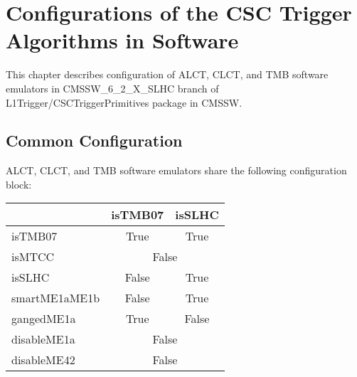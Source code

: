 \section{Configurations of the CSC Trigger Algorithms in Software}

This chapter describes configuration of ALCT, CLCT, and TMB software emulators in CMSSW\_6\_2\_X\_SLHC branch of L1Trigger/CSCTriggerPrimitives package in CMSSW.

\subsection{Common Configuration}
\label{sec:common_conf}

ALCT, CLCT, and TMB software emulators share the following configuration block:

\begin{center}
	\begin{tabular}{|l|c|c|}
		\hline
		& isTMB07 & isSLHC \\
		\hline
		\hline
		isTMB07 & True & True \\
		\hline
		isMTCC & \multicolumn{2}{c|}{False} \\
		\hline
		isSLHC  & False & True \\
		\hline
		smartME1aME1b & False & True \\
		\hline
		gangedME1a & True & False \\
		\hline
		disableME1a & \multicolumn{2}{c|}{False} \\
		\hline
		disableME42 & \multicolumn{2}{c|}{False} \\
		\hline
	
	\end{tabular}
\end{center}


